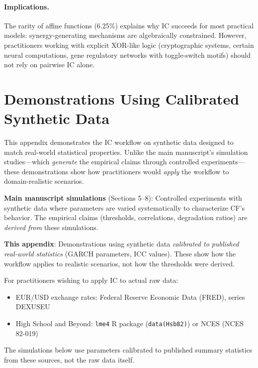 \documentclass[10pt]{article} %
\theoremstyle{plain}
\theoremstyle{definition}
\begin{document}
\paragraph{Implications.} The rarity of affine functions (6.25\%) explains why IC succeeds for most practical models: synergy-generating mechanisms are algebraically constrained. However, practitioners working with explicit XOR-like logic (cryptographic systems, certain neural computations, gene regulatory networks with toggle-switch motifs) should not rely on pairwise IC alone.
\section{Demonstrations Using Calibrated Synthetic Data}
\label{app:demonstrations}

This appendix demonstrates the IC workflow on synthetic data designed to match real-world statistical properties. Unlike the main manuscript's simulation studies---which \emph{generate} the empirical claims through controlled experiments---these demonstrations show how practitioners would \emph{apply} the workflow to domain-realistic scenarios.

\begin{tcolorbox}[breakable, colback=blue!5, colframe=blue!50!black, title=\textbf{Relationship to Main Manuscript}, fonttitle=\bfseries]
\textbf{Main manuscript simulations} (Sections 5--8): Controlled experiments with synthetic data where parameters are varied systematically to characterize CF's behavior. The empirical claims (thresholds, correlations, degradation ratios) are \emph{derived from} these simulations.

\textbf{This appendix}: Demonstrations using synthetic data \emph{calibrated to published real-world statistics} (GARCH parameters, ICC values). These show how the workflow applies to realistic scenarios, not how the thresholds were derived.
\end{tcolorbox}

\begin{tcolorbox}[breakable, colback=gray!5, colframe=gray!50!black, title=\textbf{Data Sources for Replication}, fonttitle=\bfseries]
For practitioners wishing to apply IC to actual raw data:
\begin{itemize}
    \item EUR/USD exchange rates: Federal Reserve Economic Data (FRED), series DEXUSEU
    \item High School and Beyond: \texttt{lme4} R package (\texttt{data(Hsb82)}) or NCES (NCES 82-019)
\end{itemize}
The simulations below use parameters calibrated to published summary statistics from these sources, not the raw data itself.
\end{tcolorbox}
\end{document}
